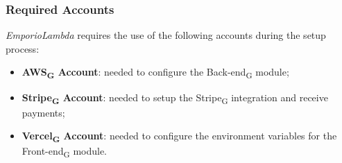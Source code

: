 \subsubsection{Required Accounts}
\textit{EmporioLambda} requires the use of the following accounts during the setup process:
\begin{itemize}
\item \textbf{AWS\textsubscript{G} Account}: needed to configure the Back-end\textsubscript{G} module;
\item \textbf{Stripe\textsubscript{G} Account}: needed to setup the Stripe\textsubscript{G} integration and receive payments;
\item \textbf{Vercel\textsubscript{G} Account}: needed to configure the environment variables for the Front-end\textsubscript{G} module.
\end{itemize}

